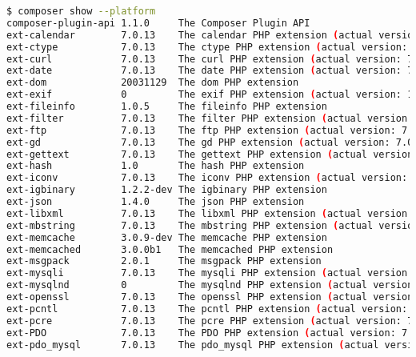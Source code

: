 \begin{lstlisting}[language=bash]
$ composer show --platform
composer-plugin-api 1.1.0     The Composer Plugin API
ext-calendar        7.0.13    The calendar PHP extension (actual version: 7.0.13-1+deb.sury.org~trusty+1)
ext-ctype           7.0.13    The ctype PHP extension (actual version: 7.0.13-1+deb.sury.org~trusty+1)
ext-curl            7.0.13    The curl PHP extension (actual version: 7.0.13-1+deb.sury.org~trusty+1)
ext-date            7.0.13    The date PHP extension (actual version: 7.0.13-1+deb.sury.org~trusty+1)
ext-dom             20031129  The dom PHP extension
ext-exif            0         The exif PHP extension (actual version: 1.4 $Id: 8bdc0c8f27c2c9dd1f7551f1f9fe3ab57a06a4b1 $)
ext-fileinfo        1.0.5     The fileinfo PHP extension
ext-filter          7.0.13    The filter PHP extension (actual version: 7.0.13-1+deb.sury.org~trusty+1)
ext-ftp             7.0.13    The ftp PHP extension (actual version: 7.0.13-1+deb.sury.org~trusty+1)
ext-gd              7.0.13    The gd PHP extension (actual version: 7.0.13-1+deb.sury.org~trusty+1)
ext-gettext         7.0.13    The gettext PHP extension (actual version: 7.0.13-1+deb.sury.org~trusty+1)
ext-hash            1.0       The hash PHP extension
ext-iconv           7.0.13    The iconv PHP extension (actual version: 7.0.13-1+deb.sury.org~trusty+1)
ext-igbinary        1.2.2-dev The igbinary PHP extension
ext-json            1.4.0     The json PHP extension
ext-libxml          7.0.13    The libxml PHP extension (actual version: 7.0.13-1+deb.sury.org~trusty+1)
ext-mbstring        7.0.13    The mbstring PHP extension (actual version: 7.0.13-1+deb.sury.org~trusty+1)
ext-memcache        3.0.9-dev The memcache PHP extension
ext-memcached       3.0.0b1   The memcached PHP extension
ext-msgpack         2.0.1     The msgpack PHP extension
ext-mysqli          7.0.13    The mysqli PHP extension (actual version: 7.0.13-1+deb.sury.org~trusty+1)
ext-mysqlnd         0         The mysqlnd PHP extension (actual version: mysqlnd 5.0.12-dev - 20150407 - $Id: 241ae00989d1995ffcbbf63d579943635faf9972 $)
ext-openssl         7.0.13    The openssl PHP extension (actual version: 7.0.13-1+deb.sury.org~trusty+1)
ext-pcntl           7.0.13    The pcntl PHP extension (actual version: 7.0.13-1+deb.sury.org~trusty+1)
ext-pcre            7.0.13    The pcre PHP extension (actual version: 7.0.13-1+deb.sury.org~trusty+1)
ext-PDO             7.0.13    The PDO PHP extension (actual version: 7.0.13-1+deb.sury.org~trusty+1)
ext-pdo_mysql       7.0.13    The pdo_mysql PHP extension (actual version: 7.0.13-1+deb.sury.org~trusty+1)

\end{lstlisting}
